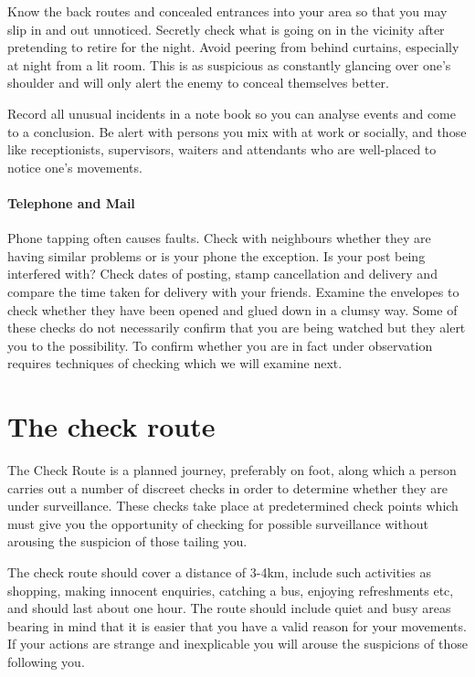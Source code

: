 Know the back routes and concealed entrances into your area so that you
may slip in and out unnoticed. Secretly check what is going on in the
vicinity after pretending to retire for the night. Avoid peering from
behind curtains, especially at night from a lit room. This is as
suspicious as constantly glancing over one's shoulder and will only
alert the enemy to conceal themselves better.

Record all unusual incidents in a note book so you can analyse events
and come to a conclusion. Be alert with persons you mix with at work or
socially, and those like receptionists, supervisors, waiters and
attendants who are well-placed to notice one's movements.

\paragraph{Telephone and Mail}

Phone tapping often causes faults. Check with neighbours whether they
are having similar problems or is your phone the exception. Is your post
being interfered with? Check dates of posting, stamp cancellation and
delivery and compare the time taken for delivery with your friends.
Examine the envelopes to check whether they have been opened and glued
down in a clumsy way. Some of these checks do not necessarily confirm
that you are being watched but they alert you to the possibility. To
confirm whether you are in fact under observation requires techniques of
checking which we will examine next.

\section{The check route}

The Check Route is a planned journey, preferably on foot, along which a
person carries out a number of discreet checks in order to determine
whether they are under surveillance. These checks take place at
predetermined check points which must give you the opportunity of
checking for possible surveillance without arousing the suspicion of
those tailing you.

The check route should cover a distance of 3-4km, include such
activities as shopping, making innocent enquiries, catching a bus,
enjoying refreshments etc, and should last about one hour. The route
should include quiet and busy areas bearing in mind that it is easier
that you have a valid reason for your movements. If your actions are
strange and inexplicable you will arouse the suspicions of those
following you.

